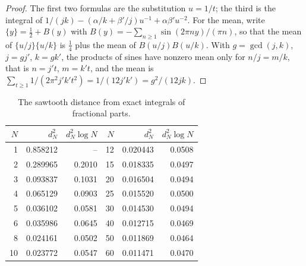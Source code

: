 \documentclass[11pt]{article}
\theoremstyle{definition}\newtheorem{definition}[theorem]{Definition}
\theoremstyle{remark}\newtheorem{remark}[theorem]{Remark}
\newcommand{\fr}[1]{\{#1\}}
\begin{document}
\begin{proof}
The first two formulas are the substitution $u=1/t$; the third is the integral of $1/(jk)-(\alpha/k+\beta'/j)u^{-1}+\alpha\beta'u^{-2}$. For the mean, write $\fr y=\frac12+B(y)$ with $B(y)=-\sum_{n\ge1}\sin(2\pi ny)/(\pi n)$, so that the mean of $\fr{u/j}\fr{u/k}$ is $\frac14$ plus the mean of $B(u/j)B(u/k)$. With $g=\gcd(j,k)$, $j=gj'$, $k=gk'$, the products of sines have nonzero mean only for $n/j=m/k$, that is $n=j't$, $m=k't$, and the mean is $\sum_{t\ge1}1/(2\pi^2j'k't^2)=1/(12j'k')=g^2/(12jk)$.
\end{proof}

\begin{table}[h]\centering\small
\begin{tabular}{@{}rrr@{\qquad}rrr@{}}\toprule
$N$ & $d_N^2$ & $d_N^2\log N$ & $N$ & $d_N^2$ & $d_N^2\log N$\\\midrule
1 & 0.858212 & -- & 12 & 0.020443 & 0.0508\\
2 & 0.289965 & 0.2010 & 15 & 0.018335 & 0.0497\\
3 & 0.093837 & 0.1031 & 20 & 0.016504 & 0.0494\\
4 & 0.065129 & 0.0903 & 25 & 0.015520 & 0.0500\\
5 & 0.036102 & 0.0581 & 30 & 0.014530 & 0.0494\\
6 & 0.035986 & 0.0645 & 40 & 0.012715 & 0.0469\\
8 & 0.024161 & 0.0502 & 50 & 0.011869 & 0.0464\\
10 & 0.023772 & 0.0547 & 60 & 0.011471 & 0.0470\\\bottomrule
\end{tabular}
\caption{The sawtooth distance from exact integrals of fractional parts.}\label{tab:dN}
\end{table}
\end{document}
